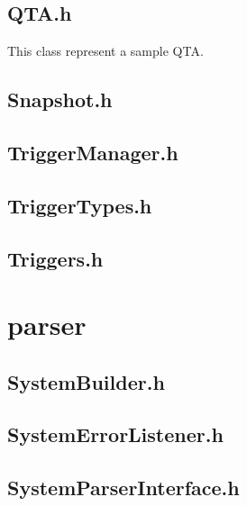 \subsection{QTA.h}
This class represent a sample QTA.


\subsection{Snapshot.h}


\subsection{TriggerManager.h}


\subsection{TriggerTypes.h}


\subsection{Triggers.h}


\section{parser}

\subsection{SystemBuilder.h}


\subsection{SystemErrorListener.h}


\subsection{SystemParserInterface.h}


